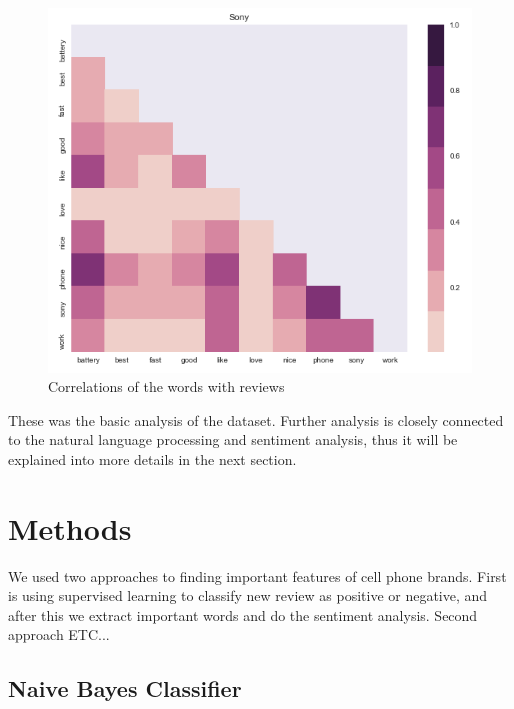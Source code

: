 \documentclass[11pt]{article}
\begin{document}
\begin{figure}[h!]
  \centering
    \includegraphics[width=\linewidth]{correlations.png}
  \caption{Correlations of the words with reviews}
  \label{fig:correlations}
\end{figure}

These was the basic analysis of the dataset. Further analysis is closely connected to the natural language processing and sentiment analysis, thus it will be explained into more details in the next section. 


\section{Methods}
We used two approaches to finding important features of cell phone brands. First is using supervised learning to classify new review as positive or negative, and after this we extract important words and do the sentiment analysis. Second approach ETC...


\subsection{Naive Bayes Classifier}
\end{document}
